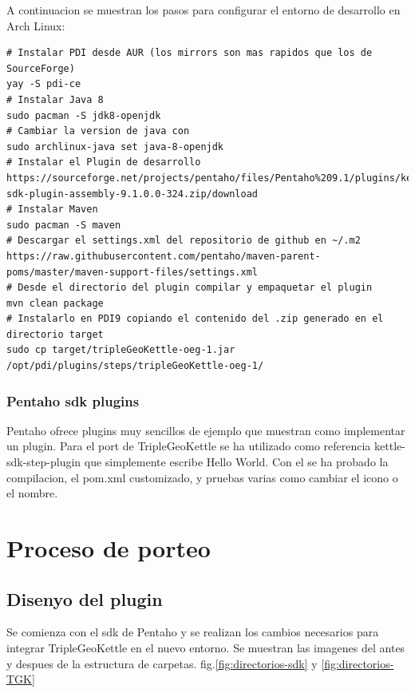A continuacion se muestran los pasos para configurar el entorno de desarrollo en Arch Linux:

\begin{lstlisting}
# Instalar PDI desde AUR (los mirrors son mas rapidos que los de SourceForge)
yay -S pdi-ce
# Instalar Java 8
sudo pacman -S jdk8-openjdk
# Cambiar la version de java con
sudo archlinux-java set java-8-openjdk
# Instalar el Plugin de desarrollo
https://sourceforge.net/projects/pentaho/files/Pentaho%209.1/plugins/kettle-sdk-plugin-assembly-9.1.0.0-324.zip/download
# Instalar Maven
sudo pacman -S maven
# Descargar el settings.xml del repositorio de github en ~/.m2
https://raw.githubusercontent.com/pentaho/maven-parent-poms/master/maven-support-files/settings.xml
# Desde el directorio del plugin compilar y empaquetar el plugin
mvn clean package
# Instalarlo en PDI9 copiando el contenido del .zip generado en el directorio target
sudo cp target/tripleGeoKettle-oeg-1.jar /opt/pdi/plugins/steps/tripleGeoKettle-oeg-1/
\end{lstlisting}

\subsubsection{Pentaho sdk plugins}

Pentaho ofrece plugins\cite{pdi-sdk} muy sencillos de ejemplo que muestran como implementar un plugin. Para el port de
TripleGeoKettle se ha utilizado como referencia kettle-sdk-step-plugin que simplemente escribe Hello World. Con
el se ha probado la compilacion, el pom.xml customizado, y pruebas varias como cambiar el icono o el nombre.


\section{Proceso de porteo}

\subsection{Disenyo del plugin}



Se comienza con el sdk de Pentaho y se realizan los cambios necesarios para integrar TripleGeoKettle en el nuevo
entorno. Se muestran las imagenes del antes y despues de la estructura de carpetas. fig.\ref{fig:directorios-sdk}
y \ref{fig:directorios-TGK}

